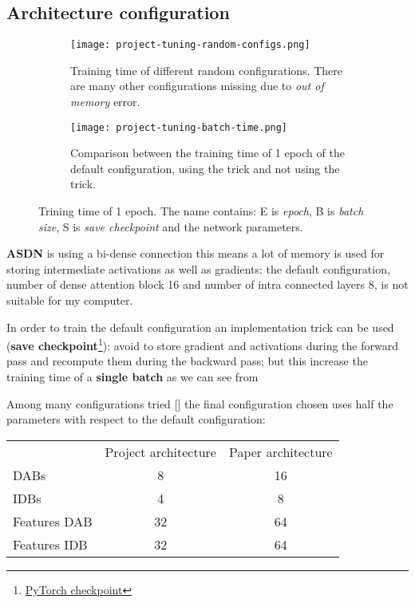 \subsection{Architecture configuration}
\begin{figure}
    \begin{subfigure}{\textwidth}
        \centering
        \texttt{[image: project-tuning-random-configs.png]}
        \caption{Training time of different random configurations. There are many other configurations missing due to \textit{out of memory} error.}\label{project:random-configurations}
    \end{subfigure}
    \begin{subfigure}{\textwidth}
        \centering
        \texttt{[image: project-tuning-batch-time.png]}        
        \caption{Comparison between the training time of 1 epoch of the default configuration, using the trick and not using the trick.}\label{project:batch-time}
    \end{subfigure}

    \caption{Trining time of 1 epoch. The name contains: E is \textit{epoch}, B is \textit{batch size}, S is \textit{save checkpoint} and the network parameters.}    
\end{figure}

\textbf{ASDN} is using a bi-dense connection this means a lot of memory is used for storing intermediate activations as well as gradients: the default configuration, number of dense attention block 16 and number of intra connected layers 8, is not suitable for my computer.

In order to train the default configuration an implementation trick can be used (\textbf{save checkpoint}\footnote{\href{https://pytorch.org/docs/stable/checkpoint.html}{PyTorch checkpoint}}): avoid to store gradient and activations during the forward pass and recompute them during the backward pass; but this increase the training time of a \textbf{single batch} as we can see from 

Among many configurations tried [] the final configuration chosen uses half the parameters with respect to the default configuration:

\begin{tabular}{lcc}
    & Project architecture & Paper architecture \\
    DABs & 8 & 16 \\
    IDBs & 4 & 8 \\
    Features DAB & 32 & 64 \\
    Features IDB & 32 & 64 
\end{tabular}

